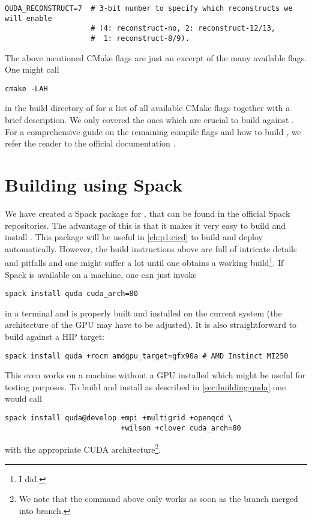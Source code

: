 \begin{verbatim}
QUDA_RECONSTRUCT=7  # 3-bit number to specify which reconstructs we will enable
                    # (4: reconstruct-no, 2: reconstruct-12/13, 
                    #  1: reconstruct-8/9).
\end{verbatim}
The above mentioned CMake flags are just an excerpt of the many available flags.
One might call
\begin{verbatim}
cmake -LAH
\end{verbatim}
in the build directory of \quda for a list of all available CMake flags together with a brief description.
We only covered the ones which are crucial to build \openqxd against \quda.
For a comprehensive guide on the remaining compile flags and how to build \quda, we refer the reader to the official documentation \cite{github:quda}.

\section{Building \quda using Spack}
\label{sec:building:quda:spack}

We have created a Spack\cite{Gamblin_The_Spack_Package_2015} package for \quda, that can be found in the official Spack repositories\cite{spack:quda}.
The advantage of this is that it makes it very easy to build and install \quda.
This package will be useful in \cref{ch:p1:cicd} to build and deploy automatically.
However, the build instructions above are full of intricate details and pitfalls and one might suffer a lot until one obtains a working build\footnote{I did.}.
If Spack is available on a machine, one can just invoke
\begin{verbatim}
spack install quda cuda_arch=80
\end{verbatim}
in a terminal and \quda is properly built and installed on the current system (the architecture  of the GPU may have to be adjusted).
It is also straightforward to build against a HIP target:
\begin{verbatim}
spack install quda +rocm amdgpu_target=gfx90a # AMD Instinct MI250
\end{verbatim}
This even works on a machine without a GPU installed which might be useful for testing purposes.
To build and install \quda as described in \cref{sec:building:quda} one would call
\begin{verbatim}
spack install quda@develop +mpi +multigrid +openqcd \
                           +wilson +clover cuda_arch=80
\end{verbatim}
with the appropriate CUDA architecture\footnote{
We note that the command above only works as soon as the  branch merged into \qudas {} branch.
}.

